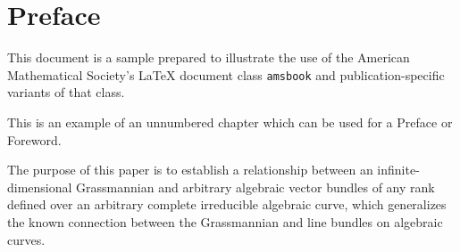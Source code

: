 %

\chapter*{Preface}

This document is a sample prepared to illustrate the use of the
American Mathematical Society's \LaTeX{} document class
\texttt{amsbook} and publication-specific variants of that class.

This is an example of an unnumbered chapter which can be used for a Preface
or Foreword.

The purpose of this paper is to establish a relationship between an
infinite-dimensional Grassmannian and arbitrary algebraic vector bundles
of any rank defined over an arbitrary complete irreducible algebraic
curve, which generalizes the known connection between the Grassmannian
and line bundles on algebraic curves.


